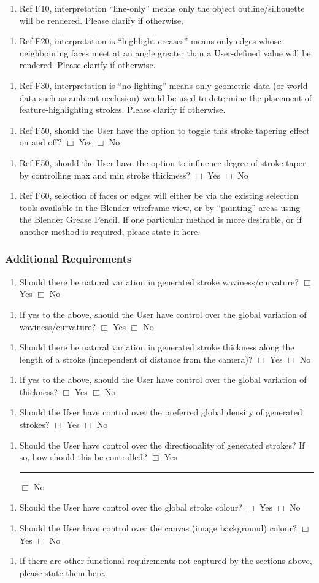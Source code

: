 \documentclass[a4paper,10pt]{article}
\newcommand{\Qq}[1]{#1}
\newcommand{\QO}{$\Box$}%
\newcommand{\Qline}[1]{\noindent\rule{#1}{0.6pt}}
\newcounter{ql}
\newcommand{\Qlines}[1]{\forloop{ql}{0}{\value{ql}<#1}{\vskip0em\Qline{\linewidth}}}
\newcommand{\Qitemf}[2][]{
\begin{enumerate}[topsep=2pt,leftmargin=2.8em]
\item[\textbf{F\arabic{fReqNum}#1.}] #2
\addtocounter{fReqNum}{10}
\end{enumerate}
}
\newcommand{\Qitemclar}[2][]{
\begin{enumerate}[topsep=2pt,leftmargin=2.8em]
\item[\textbf{C\arabic{clarNum}#1.}] #2
\addtocounter{clarNum}{10}
\end{enumerate}
}
\begin{document}
\Qitemclar{\Qq{Ref F10, interpretation ``line-only'' means only the object outline/silhouette will be rendered. Please clarify if otherwise.} \Qlines{2}}
\Qitemclar{\Qq{Ref F20, interpretation is ``highlight creases'' means only edges whose neighbouring faces meet at an angle greater than a User-defined value will be rendered. Please clarify if otherwise.} \Qlines{2}}
\Qitemclar{\Qq{Ref F30, interpretation is ``no lighting'' means only geometric data (or world data such as ambient occlusion) would be used to determine the placement of feature-highlighting strokes. Please clarify if otherwise.} \Qlines{2}}
\Qitemclar{\Qq{Ref F50, should the User have the option to toggle this stroke tapering effect on and off?}  \newline \QO{} Yes \hskip0.5cm \QO{} No}
\Qitemclar{\Qq{Ref F50, should the User have the option to influence degree of stroke taper by controlling max and min stroke thickness?} \newline \QO{} Yes \hskip0.5cm \QO{} No}
\Qitemclar{\Qq{Ref F60, selection of faces or edges will either be via the existing selection tools available in the Blender wireframe view, or by ``painting'' areas using the Blender Grease Pencil. If one particular method is more desirable, or if another method is required, please state it here.} \Qlines{4}}

\subsubsection{Additional Requirements}

\Qitemf{\Qq{Should there be natural variation in generated stroke waviness/curvature?} \newline \QO{} Yes \hskip0.5cm \QO{} No}
\Qitemf{\Qq{If yes to the above, should the User have control over the global variation of waviness/curvature?} \newline \QO{} Yes \hskip0.5cm \QO{} No}
\Qitemf{\Qq{Should there be natural variation in generated stroke thickness along the length of a stroke (independent of distance from the camera)?} \newline \QO{} Yes \hskip0.5cm \QO{} No}
\Qitemf{\Qq{If yes to the above, should the User have control over the global variation of thickness?} \newline \QO{} Yes \hskip0.5cm \QO{} No}
\Qitemf{\Qq{Should the User have control over the preferred global density of generated strokes?} \newline \QO{} Yes \hskip0.5cm \QO{} No}
\Qitemf{\Qq{Should the User have control over the directionality of generated strokes? If so, how should this be controlled?} \newline \QO{} Yes \Qline{8cm} \hskip0.5cm \QO{} No}
\Qitemf{\Qq{Should the User have control over the global stroke colour?} \newline \QO{} Yes \hskip0.5cm \QO{} No}
\Qitemf{\Qq{Should the User have control over the canvas (image background) colour?} \newline \QO{} Yes \hskip0.5cm \QO{} No}
\Qitemf{\Qq{If there are other functional requirements not captured by the sections above, please state them here.} \Qlines{10}}
\end{document}
